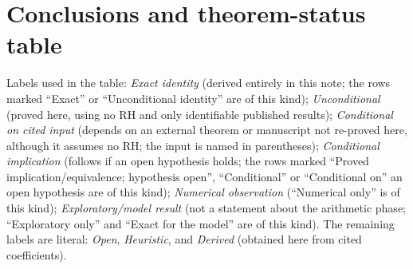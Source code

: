 \documentclass[11pt,a4paper]{article}
\numberwithin{equation}{section}
\theoremstyle{definition}
\theoremstyle{remark}
\begin{document}
\section{Conclusions and theorem-status table}\label{sec:conclusion}
\begingroup\footnotesize
\setlength{\LTpre}{5pt}\setlength{\LTpost}{8pt}
\noindent Labels used in the table: \emph{Exact identity} (derived entirely in this note; the rows marked ``Exact'' or ``Unconditional identity'' are of this kind); \emph{Unconditional} (proved here, using no RH and only identifiable published results); \emph{Conditional on cited input} (depends on an external theorem or manuscript not re-proved here, although it assumes no RH; the input is named in parentheses); \emph{Conditional implication} (follows if an open hypothesis holds; the rows marked ``Proved implication/equivalence; hypothesis open'', ``Conditional'' or ``Conditional on'' an open hypothesis are of this kind); \emph{Numerical observation} (``Numerical only'' is of this kind); \emph{Exploratory/model result} (not a statement about the arithmetic phase; ``Exploratory only'' and ``Exact for the model'' are of this kind). The remaining labels are literal: \emph{Open}, \emph{Heuristic}, and \emph{Derived} (obtained here from cited coefficients).
\end{document}
